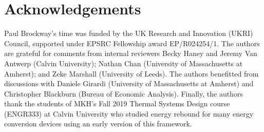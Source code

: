 \documentclass[12pt]{article}\usepackage[]{graphicx}\usepackage[]{xcolor}
\begin{document}
\section*{Acknowledgements}
\label{sec:acknowledgements}




Paul Brockway’s time was funded by the UK Research and Innovation (UKRI) 
Council, supported under EPSRC Fellowship award EP/R024254/1.
The authors are grateful for comments from internal reviewers
Becky Haney and Jeremy Van Antwerp (Calvin University); 
Nathan Chan (University of Massachusetts at Amherst); and 
Zeke Marshall (University of Leeds).
The authors benefitted from discussions with 
Daniele Girardi (University of Massachusetts at Amherst) and 
Christopher Blackburn (Bureau of Economic Analysis).
Finally, the authors thank the students of MKH's Fall 2019 
Thermal Systems Design course (ENGR333) at Calvin University
who studied energy rebound for many energy conversion devices
using an early version of this framework.


{
\scriptsize

}


\appendix
{}
\end{document}

